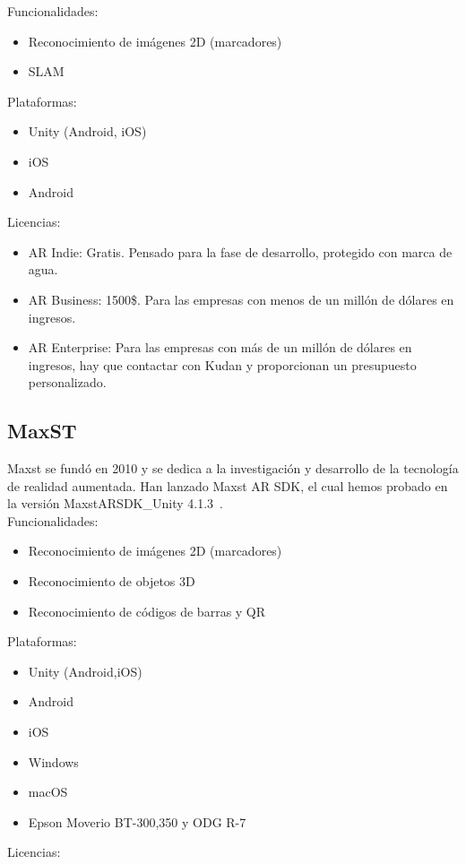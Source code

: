 Funcionalidades:
\begin{itemize}
\item Reconocimiento de imágenes 2D (marcadores)
\item SLAM
\end{itemize}
Plataformas:
\begin{itemize}
\item Unity (Android, iOS)
\item iOS
\item Android
\end{itemize}
Licencias:
\begin{itemize}
\item AR Indie: Gratis. Pensado para la fase de desarrollo, protegido con marca de agua.
\item AR Business: 1500\$. Para las empresas con menos de un millón de dólares en ingresos.
\item AR Enterprise: Para las empresas con más de un millón de dólares en ingresos, hay que contactar con Kudan y proporcionan un presupuesto personalizado.
\end{itemize}


\subsection{MaxST}



Maxst se fundó en 2010 y se dedica a la investigación y desarrollo de la tecnología de realidad aumentada. Han lanzado Maxst AR SDK, el cual hemos probado en la versión MaxstARSDK\_Unity 4.1.3~\cite{Maxst}.\\

Funcionalidades:
\begin{itemize}
\item Reconocimiento de imágenes 2D (marcadores)
\item Reconocimiento de objetos 3D
\item Reconocimiento de códigos de barras y QR
\end{itemize}
Plataformas:
\begin{itemize}
\item Unity (Android,iOS)
\item Android
\item iOS
\item Windows
\item macOS
\item Epson Moverio BT-300,350 y ODG R-7
\end{itemize}
Licencias:

